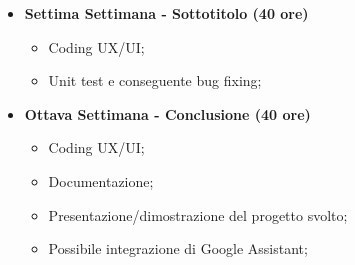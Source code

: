{\begin{itemize}
\begin{itemize}
            \item Coding UX/UI;
            \item Unit test e conseguente bug fixing;
        \end{itemize}
        \item \textbf{Settima Settimana - Sottotitolo (40 ore)} 
        \begin{itemize}
            \item Coding UX/UI;
            \item Unit test e conseguente bug fixing;
        \end{itemize}
        \item \textbf{Ottava Settimana - Conclusione (40 ore)} 
        \begin{itemize}
            \item Coding UX/UI;
            \item Documentazione;
            \item Presentazione/dimostrazione del progetto svolto;
            \item Possibile integrazione di Google Assistant;
        \end{itemize}
    \end{itemize}
}

\newcommand{\totaleOre}{320}

\newcommand{\obiettiviObbligatori}{
	 \item \underline{\textit{O01}}: comprensione delle tecnologie utilizzate in Vimar;
	 \item \underline{\textit{O02}}: creazione di un app per smartwatch che possa comunicare con un'app companion mobile;
	 \item \underline{\textit{O03}}: integrazione della precedente app con un sistema IoT vimar;
	 
}

\newcommand{\obiettiviDesiderabili}{
	 \item \underline{\textit{D01}}: comprensione sul funzionamento di Google Assistant e come integrarlo in app;
}

\newcommand{\obiettiviFacoltativi}{
	 \item \underline{\textit{F01}}: integrazione di Google Assistant;
}